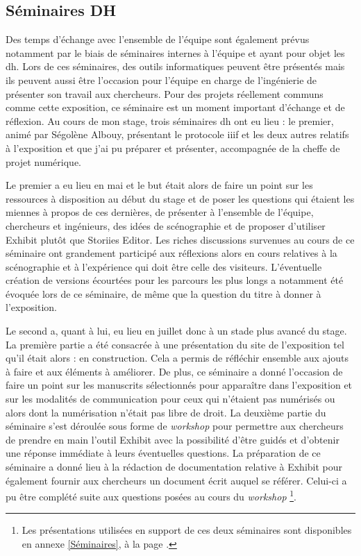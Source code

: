	\subsection{Séminaires DH}
	Des temps d'échange avec l'ensemble de l'équipe sont également prévus notamment par le biais de séminaires internes à l'équipe et ayant pour objet les \acrlong{dh}. Lors de ces séminaires, des outils informatiques peuvent être présentés mais ils peuvent aussi être l'occasion pour l'équipe en charge de l'ingénierie de présenter son travail aux chercheurs. Pour des projets réellement communs comme cette exposition, ce séminaire est un moment important d'échange et de réflexion. Au cours de mon stage, trois séminaires \acrshort{dh} ont eu lieu : le premier, animé par Ségolène Albouy, présentant le protocole \acrshort{iiif} et les deux autres relatifs à l'exposition et que j'ai pu préparer et présenter, accompagnée de la cheffe de projet numérique. 
	
	Le premier a eu lieu en mai et le but était alors de faire un point sur les ressources à disposition au début du stage et de poser les questions qui étaient les miennes à propos de ces dernières, de présenter à l'ensemble de l'équipe, chercheurs et ingénieurs, des idées de scénographie et de proposer d'utiliser Exhibit plutôt que Storiies Editor. Les riches discussions survenues au cours de ce séminaire ont grandement participé aux réflexions alors en cours relatives à la scénographie et à l'expérience qui doit être celle des visiteurs. L'éventuelle création de versions écourtées pour les parcours les plus longs a notamment été évoquée lors de ce séminaire, de même que la question du titre à donner à l'exposition. 
	
	Le second a, quant à lui, eu lieu en juillet donc à un stade plus avancé du stage. La première partie a été consacrée à une présentation du site de l'exposition tel qu'il était alors : en construction. Cela a permis de réfléchir ensemble aux ajouts à faire et aux éléments à améliorer. De plus, ce séminaire a donné l'occasion de faire un point sur les manuscrits sélectionnés pour apparaître dans l'exposition et sur les modalités de communication pour ceux qui n'étaient pas numérisés ou alors dont la numérisation n'était pas libre de droit. La deuxième partie du séminaire s'est déroulée sous forme de \textit{workshop} pour permettre aux chercheurs de prendre en main l'outil Exhibit avec la possibilité d'être guidés et d'obtenir une réponse immédiate à leurs éventuelles questions. La préparation de ce séminaire a donné lieu à la rédaction de documentation relative à Exhibit pour également fournir aux chercheurs un document écrit auquel se référer. Celui-ci a pu être complété suite aux questions posées au cours du \textit{workshop} \footnote{Les présentations utilisées en support de ces deux séminaires sont disponibles en annexe \ref{Séminaires}, à la page \pageref{Séminaires}.}.

